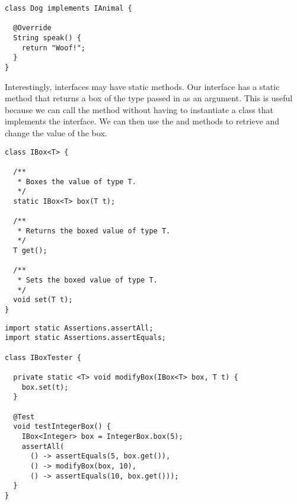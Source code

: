 \begin{lstlisting}[language=MyJava]
class Dog implements IAnimal {

  @Override
  String speak() { 
    return "Woof!"; 
  }
}
\end{lstlisting}


Interestingly, interfaces may have static methods. Our  interface has a static  method that returns a box of the type passed in as an argument. This is useful because we can call the  method without having to instantiate a class that implements the  interface. We can then use the  and  methods to retrieve and change the value of the box.

\begin{lstlisting}[language=MyJava]
class IBox<T> {
  
  /**
   * Boxes the value of type T.
   */
  static IBox<T> box(T t);

  /**
   * Returns the boxed value of type T.
   */
  T get();

  /**
   * Sets the boxed value of type T.
   */
  void set(T t);
}
\end{lstlisting}

\begin{lstlisting}[language=MyJava]
import static Assertions.assertAll;
import static Assertions.assertEquals;

class IBoxTester {

  private static <T> void modifyBox(IBox<T> box, T t) {
    box.set(t);
  }
  
  @Test
  void testIntegerBox() {
    IBox<Integer> box = IntegerBox.box(5);
    assertAll(
      () -> assertEquals(5, box.get()),
      () -> modifyBox(box, 10),
      () -> assertEquals(10, box.get()));
  }
}
\end{lstlisting}

